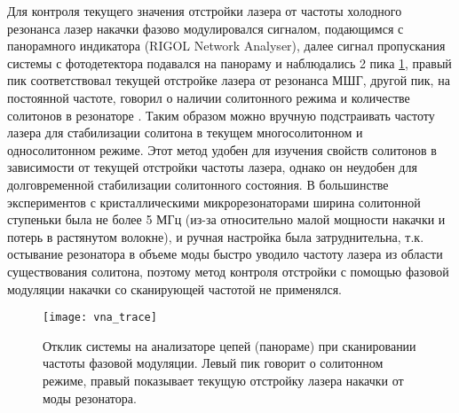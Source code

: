 \begin{figure}[ht]
\centering
  
  
\end{figure}

Для контроля текущего значения отстройки лазера от частоты холодного резонанса лазер накачки фазово модулировался сигналом, подающимся с панорамного индикатора (RIGOL Network Analyser), далее сигнал пропускания системы с фотодетектора подавался на панораму и наблюдались 2 пика \ref{vna_trace}, правый пик соответствовал текущей отстройке лазера от резонанса МШГ, другой пик, на постоянной частоте, говорил о наличии солитонного режима и количестве солитонов в резонаторе \cite{Karpov2017}. Таким образом можно вручную подстраивать частоту лазера для стабилизации солитона в текущем многосолитонном и односолитонном режиме. Этот метод удобен для изучения свойств солитонов в зависимости от текущей отстройки частоты лазера, однако он неудобен для долговременной стабилизации солитонного состояния. В большинстве экспериментов с кристаллическими микрорезонаторами ширина солитонной ступеньки была не более 5 МГц (из-за относительно малой мощности накачки и потерь в растянутом волокне), и ручная настройка была затруднительна, т.к. остывание резонатора в объеме моды быстро уводило частоту лазера из области существования солитона, поэтому метод контроля отстройки с помощью фазовой модуляции накачки со сканирующей частотой не применялся.

\begin{figure}[ht]
\centering
  \texttt{[image: vna\_trace]}
  \caption{Отклик системы на анализаторе цепей (панораме) при сканировании частоты фазовой модуляции. Левый пик говорит о солитонном режиме, правый показывает текущую отстройку лазера накачки от моды резонатора.}
  \label{vna_trace}
\end{figure}


